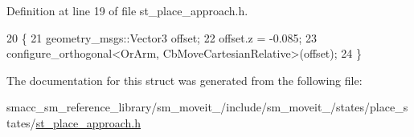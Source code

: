 Definition at line 19 of file st\+\_\+place\+\_\+approach.\+h.


\begin{DoxyCode}
20     \{
21         geometry\_msgs::Vector3 offset;
22         offset.z = -0.085;
23         configure\_orthogonal<OrArm, CbMoveCartesianRelative>(offset);
24     \}
\end{DoxyCode}


The documentation for this struct was generated from the following file\+:\begin{DoxyCompactItemize}
\item 
smacc\+\_\+sm\+\_\+reference\+\_\+library/sm\+\_\+moveit\+\_/include/sm\+\_\+moveit\+\_/states/place\+\_\+states/\hyperlink{4_2include_2sm__moveit__4_2states_2place__states_2st__place__approach_8h}{st\+\_\+place\+\_\+approach.\+h}\end{DoxyCompactItemize}
